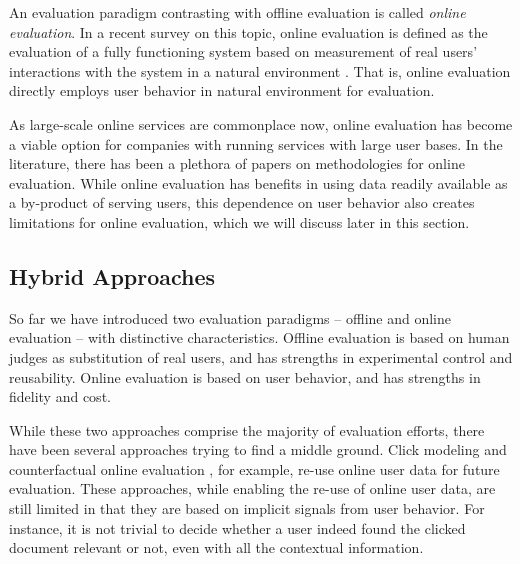 An evaluation paradigm contrasting with offline evaluation is called \textit{online evaluation}. In a recent survey on this topic, online evaluation is defined as the evaluation of a fully functioning system based on measurement of real users' interactions with the system in a natural environment \citep{INR-XYZ}. That is, online evaluation directly employs user behavior in natural environment for evaluation.

As large-scale online services are commonplace now, online evaluation has become a viable option for companies with running services with large user bases. In the literature, there has been a plethora of papers on methodologies for online evaluation. While online evaluation has benefits in using data readily available as a by-product of serving users, this dependence on user behavior also creates limitations for online evaluation, which we will discuss later in this section.

\subsection{Hybrid Approaches}

So far we have introduced two evaluation paradigms -- offline and online evaluation -- with distinctive characteristics. Offline evaluation is based on human judges as substitution of real users, and has strengths in experimental control and reusability. Online evaluation is based on user behavior, and has strengths in fidelity and cost.


While these two approaches comprise the majority of evaluation efforts, there have been several approaches trying to find a middle ground. Click modeling \citep{chuklin2015click} and counterfactual online evaluation \citep{Li:2015, li2010contextual}, for example, re-use online user data for future evaluation. These approaches, while enabling the re-use of online user data, are still limited in that they are based on implicit signals from user behavior. For instance, it is not trivial to decide whether a user indeed found the clicked document relevant or not, even with all the contextual information.

